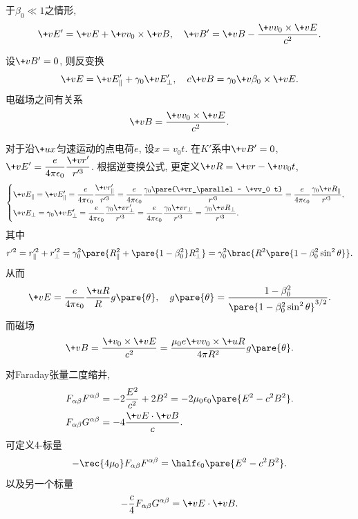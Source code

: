 \documentclass[hidelinks]{ctexart}
\begin{document}
\begin{ex}
    于$\beta_0 \ll 1$之情形,
    \[ \+vE' = \+vE + \+vv_0 \times \+vB,\quad \+vB' = \+vB - \frac{\+vv_0 \times \+vE}{c^2}. \]
\end{ex}
\begin{ex}
    设$\+vB' = 0$, 则反变换
    \[ \+vE = \+vE'_\parallel + \gamma_0 \+vE'_\perp,\quad c\+vB = \gamma_0 \+v\beta_0 \times \+vE. \]
    电磁场之间有关系
    \[ \+vB = \frac{\+vv_0 \times \+vE}{c^2}. \]
\end{ex}
\begin{sample}
    \begin{ex}
        对于沿$\+ux$匀速运动的点电荷$e$, 设$x = v_0 t$. 在$K'$系中$\+vB' = 0$, $\displaystyle \+vE' = \frac{e}{4\pi\epsilon_0}\frac{\+vr'}{r'^3}$. 根据逆变换公式, 更定义$\+vR = \+vr - \+vv_0 t$,
        \[ \begin{cases}
            \displaystyle \+vE_\parallel = \+vE'_\parallel = \frac{e}{4\pi\epsilon_0} \frac{\+vr'_\parallel}{r'^3} = \frac{e}{4\pi\epsilon_0} \frac{\gamma_0 \pare{\+vr_\parallel - \+vv_0 t}}{r'^3} = \frac{e}{4\pi\epsilon_0}\frac{\gamma_0 \+vR_\parallel}{r'^3}, \\[.5em]
            \displaystyle \+vE_\perp = \gamma_0 \+vE'_\perp = \frac{e}{4\pi\epsilon_0} \frac{\gamma_0 \+vr'_\perp}{r'^3} = \frac{e}{4\pi\epsilon_0} \frac{\gamma_0 \+vr_\perp}{r'^3} = \frac{\gamma_0 \+vR_\perp}{r'^3}.
        \end{cases} \]
        其中
        \[ r'^2 = r'^2_\parallel + r'^2_\perp = \gamma_0^2 \pare{R_\parallel^2 + \pare{1-\beta_0^2}R_\perp^2} = \gamma_0^2 \brac{R^2 \pare{1-\beta_0^2\sin^2\theta}}. \]
        从而
        \[ \+vE = \frac{e}{4\pi\epsilon_0}\frac{\+uR}{R}g\pare{\theta},\quad g\pare{\theta} = \frac{1-\beta_0^2}{\pare{1-\beta_0^2\sin^2\theta}^{3/2}}. \]
        而磁场
        \[ \+vB = \frac{\+v_0\times \+vE}{c^2} = \frac{\mu_0 e\+vv_0\times \+uR}{4\pi R^2}g\pare{\theta}. \]
    \end{ex}
\end{sample}
对Faraday张量二度缩并,
\begin{align*}
    F_{\alpha\beta}F^{\alpha\beta} &= -2\frac{E^2}{c^2} + 2B^2 = -2\mu_0\epsilon_0 \pare{E^2 - c^2B^2}. \\
    F_{\alpha\beta}G^{\alpha\beta} &= -4 \frac{\+vE\cdot \+vB}{c}.
\end{align*}
可定义4-标量
\[ -\rec{4\mu_0}F_{\alpha\beta}F^{\alpha\beta} = \half \epsilon_0 \pare{E^2 - c^2B^2}. \]
以及另一个标量
\[ -\frac{c}{4}F_{\alpha\beta}G^{\alpha\beta} = \+vE\cdot \+vB. \]
\end{document}
